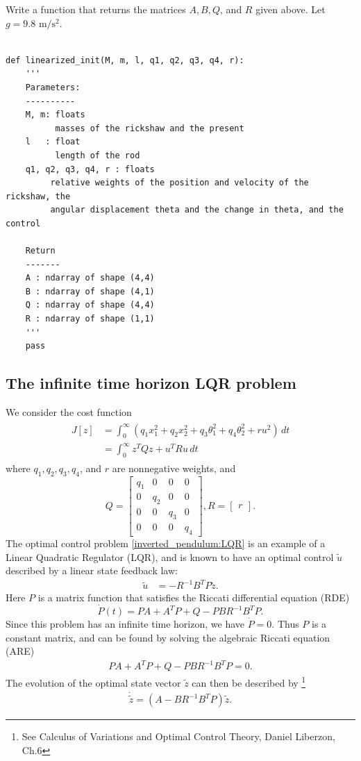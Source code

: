 \begin{problem}
Write a function that returns the matrices $A, B, Q$, and $R$ given above. Let $g = 9.8\text{ m}/\text{s}^2$.	
	
\begin{lstlisting}

def linearized_init(M, m, l, q1, q2, q3, q4, r): 
	'''
	Parameters:
	----------
	M, m: floats
          masses of the rickshaw and the present
	l 	: float
          length of the rod
	q1, q2, q3, q4, r : floats
         relative weights of the position and velocity of the rickshaw, the 
		 angular displacement theta and the change in theta, and the control
	
	Return
	-------
	A : ndarray of shape (4,4) 
	B : ndarray of shape (4,1) 
	Q : ndarray of shape (4,4) 
	R : ndarray of shape (1,1) 
	'''
	pass	
\end{lstlisting}
\end{problem}


\subsection*{The infinite time horizon LQR problem}
We consider the cost function
\begin{align}
\begin{split}
J[z] &= \int_0^{\infty} (q_1x_1^2 + q_2x_2^2  + q_3\theta_1^2 + q_4\theta_2^2 + ru^2)\, dt\\
&= \int_0^{\infty} z^TQz + u^TRu \, dt
\end{split} \label{inverted_pendulum:LQR}
\end{align}
where $q_1, q_2, q_3, q_4$, and $r$ are nonnegative weights, and 
\[
Q = 
\begin{bmatrix}
q_1 & 0 & 0 & 0 \\
0 & q_2 & 0 & 0\\
0 & 0 & q_3 & 0 \\
0 & 0 & 0 & q_4
\end{bmatrix}, R = \begin{bmatrix} r \end{bmatrix}.
\]
The optimal control problem \eqref{inverted_pendulum:LQR} is an example of a Linear Quadratic Regulator (LQR), and is known to have an optimal control $\tilde{u}$ described by a linear state feedback law:
\begin{align*}
\tilde{u} &= -R^{-1}B^TP\tilde{z}.
\end{align*}
Here $P$ is a matrix function that satisfies the Riccati differential equation (RDE)
\[
\dot{P}(t) = PA + A^TP + Q - PBR^{-1}B^T P.  
\]
Since this problem has an infinite time horizon, we have $\dot{P} = 0$. Thus $P$ is a constant matrix, and can be found by solving the algebraic Riccati equation (ARE)
\begin{align}
 PA + A^TP + Q - PBR^{-1}B^T P = 0.  \label{inverted_pendulum:ARE}
\end{align}
The evolution of the optimal state vector $\tilde{z}$ can then be described by \footnote{See Calculus of Variations and Optimal Control Theory, Daniel Liberzon, Ch.6}
\begin{align}
\dot{\tilde{z}} = (A - BR^{-1}B^TP)\tilde{z}. \label{inverted_pendulum:optimal_state}
\end{align}

